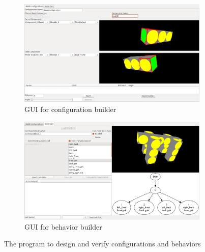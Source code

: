 \documentclass[conference]{IEEEtran}
\theoremstyle{definition}
\newcommand{\TODO}[1]{ {\bf \textcolor{red}{TODO:} #1 }}
\begin{document}
\begin{figure}
\begin{center}
        \begin{subfigure}[b]{0.9\columnwidth}
                \includegraphics[width=\textwidth]{images/conf_window.png}
                \caption{GUI for configuration builder}
                \label{fig:gui_conf}
           \end{subfigure}
           
        \begin{subfigure}[b]{0.9\columnwidth}
                \includegraphics[width=\textwidth]{images/gait_window.png}
                \caption{GUI for behavior builder}
                \label{fig:gui_gait}
        \end{subfigure}
\end{center}
\caption{The program to design and verify configurations and behaviors}
\label{fig:smores_conf}
\end{figure}

\end{document}
